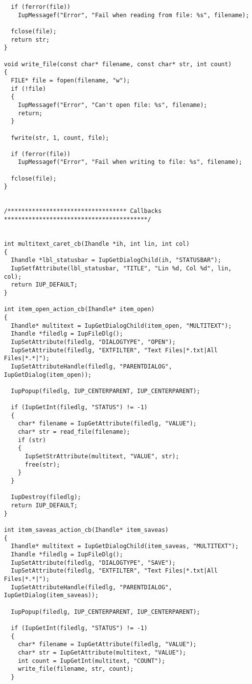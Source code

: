 \documentclass{ctexart}
\begin{document}
\begin{lstlisting}
  if (ferror(file))
    IupMessagef("Error", "Fail when reading from file: %s", filename);

  fclose(file);
  return str;
}

void write_file(const char* filename, const char* str, int count)
{
  FILE* file = fopen(filename, "w");
  if (!file)
  {
    IupMessagef("Error", "Can't open file: %s", filename);
    return;
  }

  fwrite(str, 1, count, file);

  if (ferror(file))
    IupMessagef("Error", "Fail when writing to file: %s", filename);

  fclose(file);
}


/********************************** Callbacks *****************************************/


int multitext_caret_cb(Ihandle *ih, int lin, int col)
{
  Ihandle *lbl_statusbar = IupGetDialogChild(ih, "STATUSBAR");
  IupSetfAttribute(lbl_statusbar, "TITLE", "Lin %d, Col %d", lin, col);
  return IUP_DEFAULT;
}

int item_open_action_cb(Ihandle* item_open)
{
  Ihandle* multitext = IupGetDialogChild(item_open, "MULTITEXT");
  Ihandle *filedlg = IupFileDlg();
  IupSetAttribute(filedlg, "DIALOGTYPE", "OPEN");
  IupSetAttribute(filedlg, "EXTFILTER", "Text Files|*.txt|All Files|*.*|");
  IupSetAttributeHandle(filedlg, "PARENTDIALOG", IupGetDialog(item_open));

  IupPopup(filedlg, IUP_CENTERPARENT, IUP_CENTERPARENT);

  if (IupGetInt(filedlg, "STATUS") != -1)
  {
    char* filename = IupGetAttribute(filedlg, "VALUE");
    char* str = read_file(filename);
    if (str)
    {
      IupSetStrAttribute(multitext, "VALUE", str);
      free(str);
    }
  }

  IupDestroy(filedlg);
  return IUP_DEFAULT;
}

int item_saveas_action_cb(Ihandle* item_saveas)
{
  Ihandle* multitext = IupGetDialogChild(item_saveas, "MULTITEXT");
  Ihandle *filedlg = IupFileDlg();
  IupSetAttribute(filedlg, "DIALOGTYPE", "SAVE");
  IupSetAttribute(filedlg, "EXTFILTER", "Text Files|*.txt|All Files|*.*|");
  IupSetAttributeHandle(filedlg, "PARENTDIALOG", IupGetDialog(item_saveas));

  IupPopup(filedlg, IUP_CENTERPARENT, IUP_CENTERPARENT);

  if (IupGetInt(filedlg, "STATUS") != -1)
  {
    char* filename = IupGetAttribute(filedlg, "VALUE");
    char* str = IupGetAttribute(multitext, "VALUE");
    int count = IupGetInt(multitext, "COUNT");
    write_file(filename, str, count);
  }


\end{lstlisting}
\end{document}
